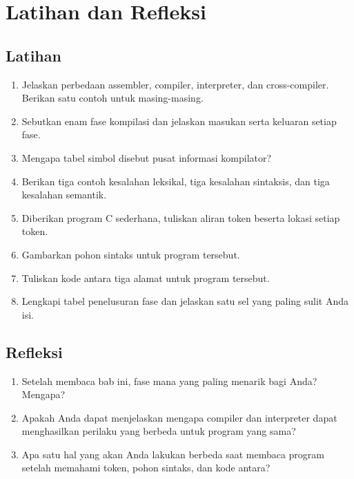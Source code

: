 \section*{Latihan dan Refleksi}

\subsection*{Latihan}
\begin{enumerate}[label=\arabic*.,leftmargin=*]
  \item Jelaskan perbedaan assembler, compiler, interpreter, dan
        cross-compiler. Berikan satu contoh untuk masing-masing.
  \item Sebutkan enam fase kompilasi dan jelaskan masukan serta
        keluaran setiap fase.
  \item Mengapa tabel simbol disebut pusat informasi kompilator?
  \item Berikan tiga contoh kesalahan leksikal, tiga kesalahan
        sintaksis, dan tiga kesalahan semantik.
  \item Diberikan program C sederhana, tuliskan aliran token beserta
        lokasi setiap token.
  \item Gambarkan pohon sintaks untuk program tersebut.
  \item Tuliskan kode antara tiga alamat untuk program tersebut.
  \item Lengkapi tabel penelusuran fase dan jelaskan satu sel yang
        paling sulit Anda isi.
\end{enumerate}

\subsection*{Refleksi}
\begin{reflectionbox}
\begin{enumerate}[label=\arabic*.,leftmargin=*]
  \item Setelah membaca bab ini, fase mana yang paling menarik bagi
        Anda? Mengapa?
  \item Apakah Anda dapat menjelaskan mengapa compiler dan interpreter
        dapat menghasilkan perilaku yang berbeda untuk program yang
        sama?
  \item Apa satu hal yang akan Anda lakukan berbeda saat membaca
        program setelah memahami token, pohon sintaks, dan kode antara?
\end{enumerate}
\end{reflectionbox}
